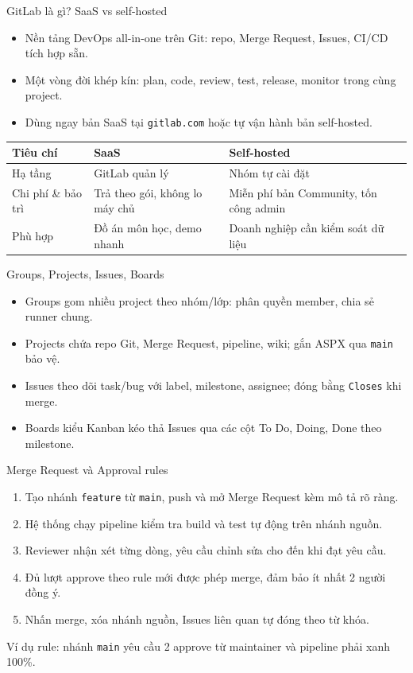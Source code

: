 \begin{frame}{GitLab là gì? SaaS vs self-hosted}
\begin{itemize}
\item Nền tảng DevOps all-in-one trên Git: repo, Merge Request, Issues, CI/CD tích hợp sẵn.
\item Một vòng đời khép kín: plan, code, review, test, release, monitor trong cùng project.
\item Dùng ngay bản SaaS tại \texttt{gitlab.com} hoặc tự vận hành bản self-hosted.
\end{itemize}
\begin{center}
\small
\begin{tabular}{lll}
\toprule
Tiêu chí & SaaS & Self-hosted \\
\midrule
Hạ tầng & GitLab quản lý & Nhóm tự cài đặt \\
Chi phí \& bảo trì & Trả theo gói, không lo máy chủ & Miễn phí bản Community, tốn công admin \\
Phù hợp & Đồ án môn học, demo nhanh & Doanh nghiệp cần kiểm soát dữ liệu \\
\bottomrule
\end{tabular}
\end{center}
\end{frame}

\begin{frame}{Groups, Projects, Issues, Boards}
\begin{itemize}
\item Groups gom nhiều project theo nhóm/lớp: phân quyền member, chia sẻ runner chung.
\item Projects chứa repo Git, Merge Request, pipeline, wiki; gắn ASPX qua \texttt{main} bảo vệ.
\item Issues theo dõi task/bug với label, milestone, assignee; đóng bằng \texttt{Closes} khi merge.
\item Boards kiểu Kanban kéo thả Issues qua các cột To Do, Doing, Done theo milestone.
\end{itemize}
\end{frame}

\begin{frame}{Merge Request và Approval rules}
\begin{enumerate}
\item Tạo nhánh \texttt{feature} từ \texttt{main}, push và mở Merge Request kèm mô tả rõ ràng.
\item Hệ thống chạy pipeline kiểm tra build và test tự động trên nhánh nguồn.
\item Reviewer nhận xét từng dòng, yêu cầu chỉnh sửa cho đến khi đạt yêu cầu.
\item Đủ lượt approve theo rule mới được phép merge, đảm bảo ít nhất 2 người đồng ý.
\item Nhấn merge, xóa nhánh nguồn, Issues liên quan tự đóng theo từ khóa.
\end{enumerate}
\vspace{0.3em}
Ví dụ rule: nhánh \texttt{main} yêu cầu 2 approve từ maintainer và pipeline phải xanh 100\%.
\end{frame}

